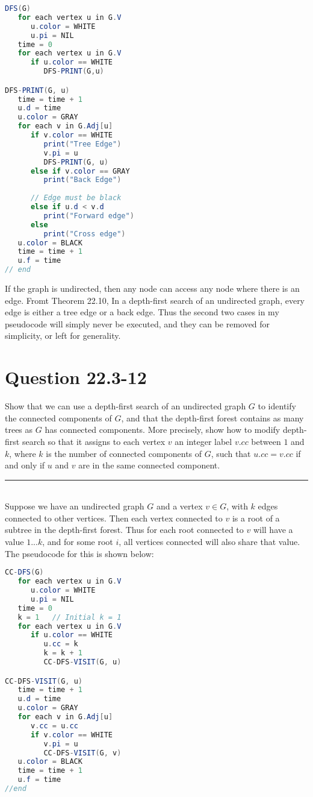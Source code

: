 \documentclass[20pt]{article} %
\begin{document}
\begin{lstlisting}[language=java]
DFS(G)
   for each vertex u in G.V
      u.color = WHITE
      u.pi = NIL
   time = 0
   for each vertex u in G.V
      if u.color == WHITE
         DFS-PRINT(G,u)

DFS-PRINT(G, u)
   time = time + 1
   u.d = time
   u.color = GRAY
   for each v in G.Adj[u]
      if v.color == WHITE
         print("Tree Edge")
         v.pi = u
         DFS-PRINT(G, u)
      else if v.color == GRAY
         print("Back Edge")
      
      // Edge must be black
      else if u.d < v.d
         print("Forward edge")
      else
         print("Cross edge")
   u.color = BLACK
   time = time + 1
   u.f = time
// end
\end{lstlisting}

\newpage
If the graph is undirected, then any node can access any node where there is an edge. Fromt Theorem 22.10, In a depth-first search of an undirected graph, every edge is either a tree edge or a back edge.  Thus the second two cases in my pseudocode will simply never be executed, and they can be removed for simplicity, or left for generality.

\section{Question 22.3-12} 
Show that we can use a depth-first search of an undirected graph $G$ to identify the connected components of $G$, and that the depth-first forest contains as many trees as $G$ has connected components.  More precisely, show how to modify depth-first search so that it assigns to each vertex $v$ an integer label $v.cc$ between $1$ and $k$, where $k$ is the number of connected components of $G$, such that $u.cc = v.cc$ if and only if $u$ and $v$ are in the same connected component. \\
\noindent\rule{2cm}{0.4pt} \\

Suppose we have an undirected graph $G$ and a vertex $v \in G$, with $k$ edges connected to other vertices.  Then each vertex connected to $v$ is a root of a subtree in the depth-first forest.  Thus for each root connected to $v$ will have a value $1...k$, and for some root $i$, all vertices connected will also share that value.  The pseudocode for this is shown below:

\begin{lstlisting}[language=java]
CC-DFS(G)
   for each vertex u in G.V
      u.color = WHITE
      u.pi = NIL
   time = 0
   k = 1   // Initial k = 1
   for each vertex u in G.V
      if u.color == WHITE
         u.cc = k
         k = k + 1
         CC-DFS-VISIT(G, u)

CC-DFS-VISIT(G, u)
   time = time + 1
   u.d = time
   u.color = GRAY
   for each v in G.Adj[u]
      v.cc = u.cc
      if v.color == WHITE
         v.pi = u
         CC-DFS-VISIT(G, v)
   u.color = BLACK
   time = time + 1
   u.f = time
//end
\end{lstlisting}
\end{document}
